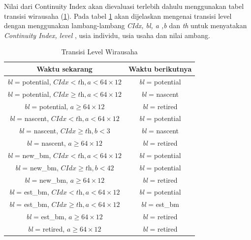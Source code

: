 Nilai dari Continuity Index akan dievaluasi terlebih dahulu menggunakan tabel transisi wirausaha (\ref{tabelLW}). Pada tabel \ref{tabelLW} akan dijelaskan mengenai transisi level dengan menggunakan lambang-lambang \textit{CIdx, bl, a ,b} dan \textit{th} untuk menyatakan \textit{Continuity Index, level} , usia individu, usia usaha dan nilai ambang.


\begin{table}[H]
\centering
\caption{Transisi Level Wirausaha}
\begin{tabular}{|c|c|}
\hline
Waktu sekarang & Waktu berikutnya \\
\hline
\textit{bl} = potential, $ \textit{CIdx} < \textit{th}, \textit{a} < 64 \times 12$ & \textit{bl} = potential \\
\hline
\textit{bl} = potential, $\textit{CIdx} \geq \textit{th}, \textit{a} < 64 \times 12$ & \textit{bl} = nascent \\
\hline
\textit{bl} = potential, $\textit{a} \geq 64 \times 12$ & \textit{bl} = retired \\
\hline
\textit{bl} = nascent, $\textit{CIdx} < \textit{th}, \textit{a} <64 \times 12$ & \textit{bl} = potential \\
\hline
\textit{bl} = nascent, $\textit{CIdx} \geq \textit{th}, \textit{b} < 3$ & \textit{bl} = nascent \\
\hline
\textit{bl} = nascent, $\textit{a} \geq 64 \times 12$ & \textit{bl} = retired \\
\hline
\textit{bl} = new\_bm, $\textit{CIdx} < \textit{th}, \textit{a} < 64 \times 12$ & \textit{bl} = potential \\
\hline
\textit{bl} = new\_bm, $\textit{CIdx} \geq \textit{th}, \textit{b} < 42$ & \textit{bl} = potential \\
\hline
\textit{bl} = new\_bm, $\textit{a} \geq 64 \times 12$ & \textit{bl} = retired \\
\hline
\textit{bl} = est\_bm, $\textit{CIdx} < \textit{th}, \textit{a} < 64 \times 12$ & \textit{bl} = potential \\
\hline
\textit{bl} = est\_bm, $\textit{CIdx} \geq \textit{th}, \textit{a} < 64 \times 12$ & \textit{bl} = est\_bm \\
\hline
\textit{bl} = est\_bm, $\textit{a} \geq 64 \times 12$ & \textit{bl} = retired \\
\hline
\textit{bl} = retired, $\textit{a} \geq 64 \times 12$ & \textit{bl} = retired \\
\hline
\end{tabular}
\label{tabelLW}
\end{table}


